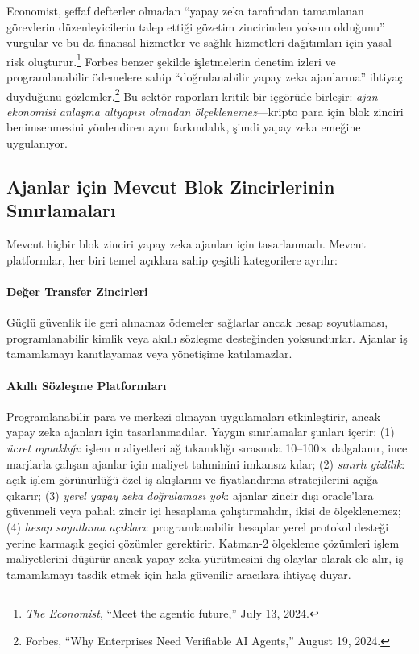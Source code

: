 \documentclass[11pt]{article}
\begin{document}
Economist, şeffaf defterler olmadan ``yapay zeka tarafından tamamlanan görevlerin düzenleyicilerin talep ettiği gözetim zincirinden yoksun olduğunu'' vurgular ve bu da finansal hizmetler ve sağlık hizmetleri dağıtımları için yasal risk oluşturur.\footnote{\emph{The Economist}, ``Meet the agentic future,'' July 13, 2024.} Forbes benzer şekilde işletmelerin denetim izleri ve programlanabilir ödemelere sahip ``doğrulanabilir yapay zeka ajanlarına'' ihtiyaç duyduğunu gözlemler.\footnote{Forbes, ``Why Enterprises Need Verifiable AI Agents,'' August 19, 2024.} Bu sektör raporları kritik bir içgörüde birleşir: \emph{ajan ekonomisi anlaşma altyapısı olmadan ölçeklenemez}---kripto para için blok zinciri benimsenmesini yönlendiren aynı farkındalık, şimdi yapay zeka emeğine uygulanıyor.

\subsection{Ajanlar için Mevcut Blok Zincirlerinin Sınırlamaları}
Mevcut hiçbir blok zinciri yapay zeka ajanları için tasarlanmadı. Mevcut platformlar, her biri temel açıklara sahip çeşitli kategorilere ayrılır:

\paragraph{Değer Transfer Zincirleri} Güçlü güvenlik ile geri alınamaz ödemeler sağlarlar ancak hesap soyutlaması, programlanabilir kimlik veya akıllı sözleşme desteğinden yoksundurlar. Ajanlar iş tamamlamayı kanıtlayamaz veya yönetişime katılamazlar.

\paragraph{Akıllı Sözleşme Platformları} Programlanabilir para ve merkezi olmayan uygulamaları etkinleştirir, ancak yapay zeka ajanları için tasarlanmadılar. Yaygın sınırlamalar şunları içerir: (1) \emph{ücret oynaklığı}: işlem maliyetleri ağ tıkanıklığı sırasında 10--100$\times$ dalgalanır, ince marjlarla çalışan ajanlar için maliyet tahminini imkansız kılar; (2) \emph{sınırlı gizlilik}: açık işlem görünürlüğü özel iş akışlarını ve fiyatlandırma stratejilerini açığa çıkarır; (3) \emph{yerel yapay zeka doğrulaması yok}: ajanlar zincir dışı oracle'lara güvenmeli veya pahalı zincir içi hesaplama çalıştırmalıdır, ikisi de ölçeklenemez; (4) \emph{hesap soyutlama açıkları}: programlanabilir hesaplar yerel protokol desteği yerine karmaşık geçici çözümler gerektirir. Katman-2 ölçekleme çözümleri işlem maliyetlerini düşürür ancak yapay zeka yürütmesini dış olaylar olarak ele alır, iş tamamlamayı tasdik etmek için hala güvenilir aracılara ihtiyaç duyar.
\end{document}
